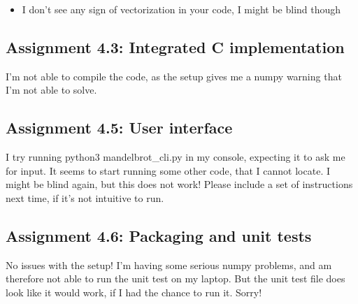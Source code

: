 \documentclass[a4paper]{article}
\begin{document}
\begin{itemize}
  \item I don't see any sign of vectorization in your code, I might be blind though
\end{itemize}


\subsection*{Assignment 4.3: Integrated C implementation}
I'm not able to compile the code, as the setup gives me a numpy warning that I'm not able to solve.



\subsection*{Assignment 4.5: User interface}
I try running python3 mandelbrot\_cli.py in my console, expecting it to ask me for input. It seems to start running some other code, that I cannot locate. I might be blind again, but this does not work! Please include a set of instructions next time, if it's not intuitive to run.

\subsection*{Assignment 4.6:  Packaging and unit tests}
No issues with the setup! I'm having some serious numpy problems, and am therefore not able to run the unit test on my laptop. But the unit test file does look like it would work, if I had the chance to run it. Sorry!





\end{document}
